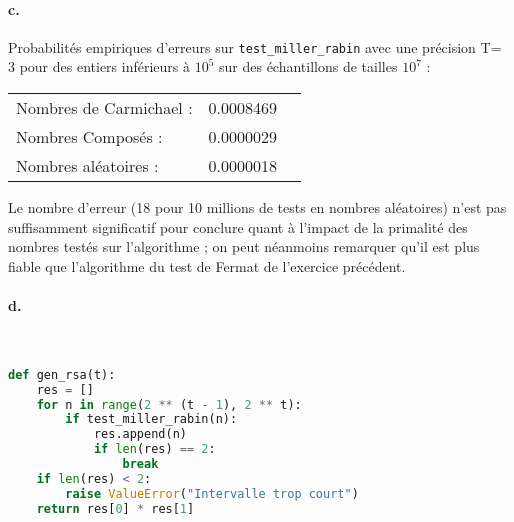 \documentclass[french]{article}
\begin{document}
\paragraph{c.} Probabilités empiriques d'erreurs sur  \verb|test_miller_rabin| avec une précision T= 3 pour des entiers inférieurs à $10^5$ sur des échantillons de tailles $10^7$ :\\
\begin{center}
    
    \begin{tabular}{lll}
        Nombres de Carmichael :&0.0008469\\
        Nombres Composés : & 0.0000029\\
        Nombres aléatoires : &0.0000018\\
    \end{tabular}
    
\end{center}
Le nombre d'erreur (18 pour 10 millions de tests en nombres aléatoires) n'est pas suffisamment significatif pour conclure quant à l'impact de la primalité des nombres testés sur l'algorithme ; on peut néanmoins remarquer qu'il est plus fiable que l'algorithme du test de Fermat de l'exercice précédent.
\paragraph{d.} \
\begin{lstlisting}[language=Python, belowskip=-1 \baselineskip]
def gen_rsa(t):
    res = []
    for n in range(2 ** (t - 1), 2 ** t):
        if test_miller_rabin(n):
            res.append(n)
            if len(res) == 2:
                break
    if len(res) < 2:
        raise ValueError("Intervalle trop court")
    return res[0] * res[1]
\end{lstlisting}
\end{document}
